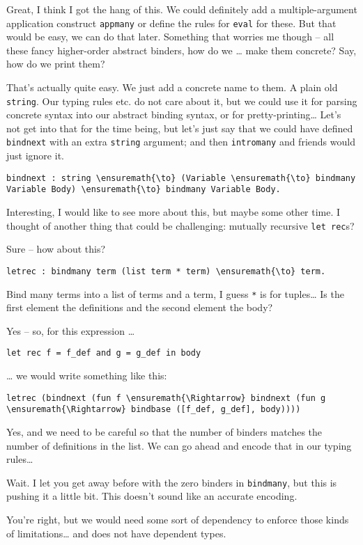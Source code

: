\heroSTUDENT{} Great, I think I got the hang of this. We could definitely add
a multiple-argument application construct \texttt{appmany} or define the
rules for \texttt{eval} for these. But that would be easy, we can do
that later. Something that worries me though -- all these fancy
higher-order abstract binders, how do we \ldots{} make them concrete?
Say, how do we print them?

\heroADVISOR{} That's actually quite easy. We just add a concrete name to
them. A plain old \texttt{string}. Our typing rules etc. do not care
about it, but we could use it for parsing concrete syntax into our
abstract binding syntax, or for pretty-printing\ldots{} Let's not get
into that for the time being, but let's just say that we could have
defined \texttt{bindnext} with an extra \texttt{string} argument; and
then \texttt{intromany} and friends would just ignore it.

\begin{verbatim}
bindnext : string \ensuremath{\to} (Variable \ensuremath{\to} bindmany Variable Body) \ensuremath{\to} bindmany Variable Body.
\end{verbatim}

\heroSTUDENT{} Interesting, I would like to see more about this, but maybe
some other time. I thought of another thing that could be challenging:
mutually recursive \texttt{let\ rec}s?

\heroADVISOR{} Sure -- how about this?

\begin{verbatim}
letrec : bindmany term (list term * term) \ensuremath{\to} term.
\end{verbatim}

\heroSTUDENT{} Bind many terms into a list of terms and a term, I guess
\texttt{*} is for tuples\ldots{} Is the first element the definitions
and the second element the body?

\heroADVISOR{} Yes -- so, for this expression \ldots{}

\begin{verbatim}
let rec f = f_def and g = g_def in body
\end{verbatim}

\heroSTUDENT{} \ldots{} we would write something like this:

\begin{verbatim}
letrec (bindnext (fun f \ensuremath{\Rightarrow} bindnext (fun g \ensuremath{\Rightarrow} bindbase ([f_def, g_def], body))))
\end{verbatim}

\heroADVISOR{} Yes, and we need to be careful so that the number of binders
matches the number of definitions in the list. We can go ahead and
encode that in our typing rules\ldots{}

\heroSTUDENT{} Wait. I let you get away before with the zero binders in
\texttt{bindmany}, but this is pushing it a little bit. This doesn't
sound like an accurate encoding.

\heroADVISOR{} You're right, but we would need some sort of dependency to
enforce those kinds of limitations\ldots{} and \lamprolog does not have
dependent types.
